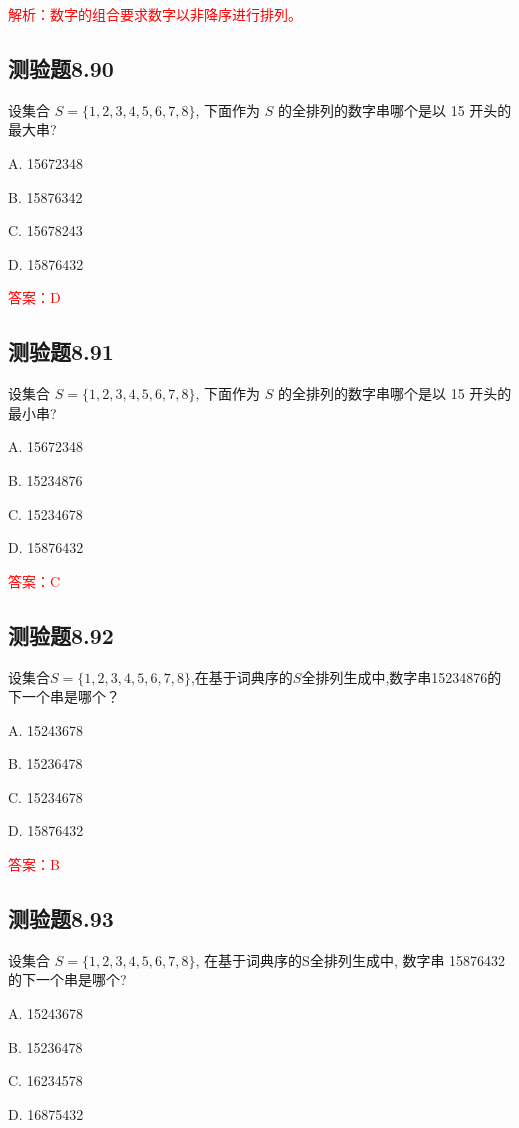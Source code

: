 \documentclass[UTF8, heading=true]{ctexart}
\begin{document}
\textcolor{red}{解析：数字的组合要求数字以非降序进行排列。}



\subsection{测验题8.90}

设集合 $S=\{1,2,3,4,5,6,7,8\}$, 下面作为 $S$ 的全排列的数字串哪个是以 15 开头的最大串?

A. 15672348

B. 15876342

C. 15678243

D. 15876432

\textcolor{red}{答案：D}

\subsection{测验题8.91}

设集合 $S=\{1,2,3,4,5,6,7,8\}$, 下面作为 $S$ 的全排列的数字串哪个是以 15 开头的最小串?

A. 15672348

B. 15234876

C. 15234678

D. 15876432

\textcolor{red}{答案：C}

\subsection{测验题8.92}

设集合$S=\{1,2,3,4,5,6,7,8\}$,在基于词典序的$S$全排列生成中,数字串15234876的下一个串是哪个？

A. 15243678

B. 15236478

C. 15234678

D. 15876432

\textcolor{red}{答案：B}

\subsection{测验题8.93}

设集合 $S=\{1,2,3,4,5,6,7,8\}$, 在基于词典序的S全排列生成中, 数字串 15876432 的下一个串是哪个?

A. 15243678

B. 15236478

C. 16234578

D. 16875432
\end{document}
